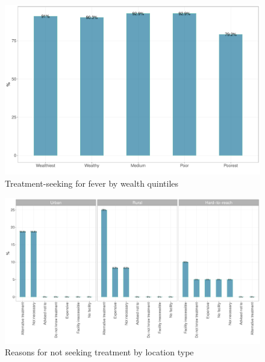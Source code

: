 \documentclass[12pt,a4paper]{article}
\begin{document}
\begin{figure}[H]

{\centering \includegraphics{kayinReport_files/figure-latex/fever2plot-1} 

}

\caption{Treatment-seeking for fever by wealth quintiles}\label{fig:fever2plot}
\end{figure}

\begin{figure}[H]

{\centering \includegraphics{kayinReport_files/figure-latex/fever3plot-1} 

}

\caption{Reasons for not seeking treatment by location type}\label{fig:fever3plot}
\end{figure}
\end{document}
